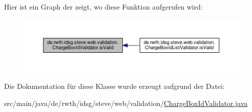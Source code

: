 Hier ist ein Graph der zeigt, wo diese Funktion aufgerufen wird\+:\nopagebreak
\begin{figure}[H]
\begin{center}
\leavevmode
\includegraphics[width=350pt]{classde_1_1rwth_1_1idsg_1_1steve_1_1web_1_1validation_1_1_charge_box_id_validator_a152d18c48b0b1984b5299909c0c6c021_icgraph}
\end{center}
\end{figure}




Die Dokumentation für diese Klasse wurde erzeugt aufgrund der Datei\+:\begin{DoxyCompactItemize}
\item 
src/main/java/de/rwth/idsg/steve/web/validation/\hyperlink{_charge_box_id_validator_8java}{Charge\+Box\+Id\+Validator.\+java}\end{DoxyCompactItemize}
